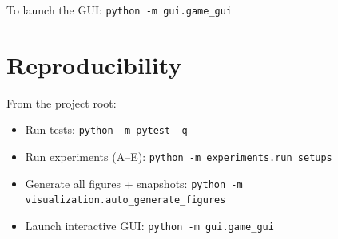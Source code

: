 \documentclass[11pt]{article}
\begin{document}
To launch the GUI: \texttt{python -m gui.game\_gui}

\section{Reproducibility}
From the project root:
\begin{itemize}
  \item Run tests: \texttt{python -m pytest -q}
  \item Run experiments (A--E): \texttt{python -m experiments.run\_setups}
  \item Generate all figures + snapshots: \texttt{python -m visualization.auto\_generate\_figures}
  \item Launch interactive GUI: \texttt{python -m gui.game\_gui}
\end{itemize}
\end{document}
